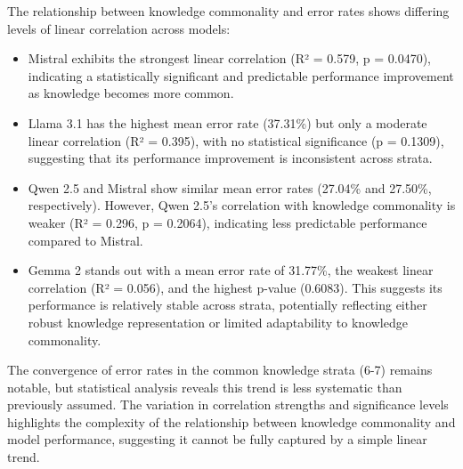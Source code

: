 The relationship between knowledge commonality and error rates shows differing levels of linear correlation across models:
\begin{itemize}
    \item Mistral exhibits the strongest linear correlation (R² = 0.579, p = 0.0470), indicating a statistically significant and predictable performance improvement as knowledge becomes more common.
    \item Llama 3.1 has the highest mean error rate (37.31\%) but only a moderate linear correlation (R² = 0.395), with no statistical significance (p = 0.1309), suggesting that its performance improvement is inconsistent across strata.
    \item Qwen 2.5 and Mistral show similar mean error rates (27.04\% and 27.50\%, respectively). However, Qwen 2.5's correlation with knowledge commonality is weaker (R² = 0.296, p = 0.2064), indicating less predictable performance compared to Mistral.
    \item Gemma 2 stands out with a mean error rate of 31.77\%, the weakest linear correlation (R² = 0.056), and the highest p-value (0.6083). This suggests its performance is relatively stable across strata, potentially reflecting either robust knowledge representation or limited adaptability to knowledge commonality.
\end{itemize}

The convergence of error rates in the common knowledge strata (6-7) remains notable, but statistical analysis reveals this trend is less systematic than previously assumed.
The variation in correlation strengths and significance levels highlights the complexity of the relationship between knowledge commonality and model performance, suggesting it cannot be fully captured by a simple linear trend.